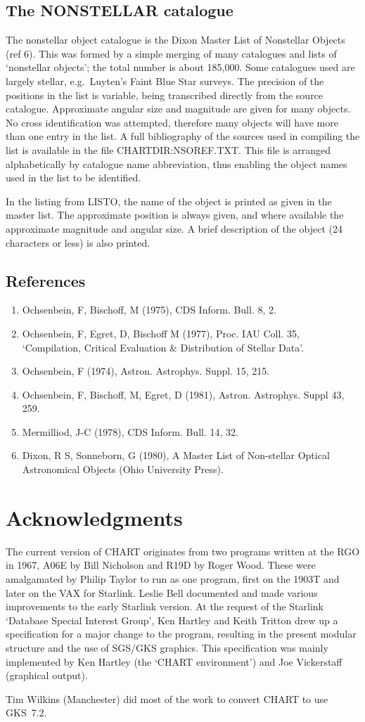 \documentclass{article}
\begin{document}
\subsection{The NONSTELLAR catalogue}
The nonstellar object catalogue is the Dixon Master List of Nonstellar Objects
(ref 6).
This was formed by a simple merging of many catalogues and lists of
`nonstellar objects'; the total number is about 185,000.
Some catalogues used are largely stellar, e.g.\ Luyten's Faint Blue Star
surveys. The precision of the positions in the list is variable, being
transcribed directly from the source catalogue. 
Approximate angular size and magnitude are given for many objects.
No cross identification was attempted, therefore many objects will have more
than one entry in the list.
A full bibliography of the sources used in compiling the list is available in
the file CHARTDIR:NSOREF.TXT.
This file is arranged alphabetically by catalogue name abbreviation, thus
enabling the object names used in the list to be identified.

In the listing from LISTO, the name of the object is printed as given in the
master list.
The approximate position is always given, and where available the approximate
magnitude and angular size.
A brief description of the object (24 characters or less) is also printed.
\subsection{References}
\begin{enumerate}
\item Ochsenbein, F, Bischoff, M (1975), CDS Inform. Bull. 8, 2.
\item Ochsenbein, F, Egret, D, Bischoff M (1977), Proc. IAU Coll. 35,
    `Compilation, Critical Evaluation \& Distribution of Stellar Data'.
\item Ochsenbein, F (1974), Astron. Astrophys. Suppl. 15, 215.
\item Ochsenbein, F, Bischoff, M, Egret, D (1981), Astron. Astrophys.
    Suppl 43, 259.
\item Mermilliod, J-C (1978), CDS Inform. Bull. 14, 32.
\item Dixon, R S, Sonneborn, G (1980),  A Master List of Non-stellar
    Optical Astronomical Objects (Ohio University Press).
\end{enumerate}
\section{Acknowledgments}
The current version of CHART originates from two programs written at the RGO in
1967, A06E by Bill Nicholson and R19D by Roger Wood.
These were amalgamated by Philip Taylor to run as one program, first on the
1903T and later on the VAX for Starlink.
Leslie Bell documented and made various improvements to the early Starlink
version.
At the request of the Starlink `Database Special Interest Group', Ken Hartley
and Keith Tritton drew up a specification for a major change to the program,
resulting in the present modular structure and the use of SGS/GKS graphics.
This specification was mainly implemented by Ken Hartley (the `CHART
environment') and Joe Vickerstaff (graphical output).

Tim Wilkins (Manchester) did most of the work to convert CHART to use GKS~7.2. 
\end{document}
